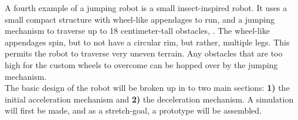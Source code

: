 \indent A fourth example of a jumping robot is a small insect-inspired robot. It uses a small compact structure with wheel-like appendages to run, and a jumping mechanism to traverse up to 18 centimeter-tall obstacles, \cite{lambrecht_small_2005}. The wheel-like appendages spin, but to not have a circular rim, but rather, multiple legs. This permits the robot to traverse very uneven terrain. Any obstacles that are too high for the custom wheels to overcome can be hopped over by the jumping mechanism. \\

\indent The basic design of the robot will be broken up in to two main sections: \textbf{1)} the initial acceleration mechanism and \textbf{2)} the deceleration mechanism. A simulation will first be made, and as a stretch-goal, a prototype will be assembled.\\